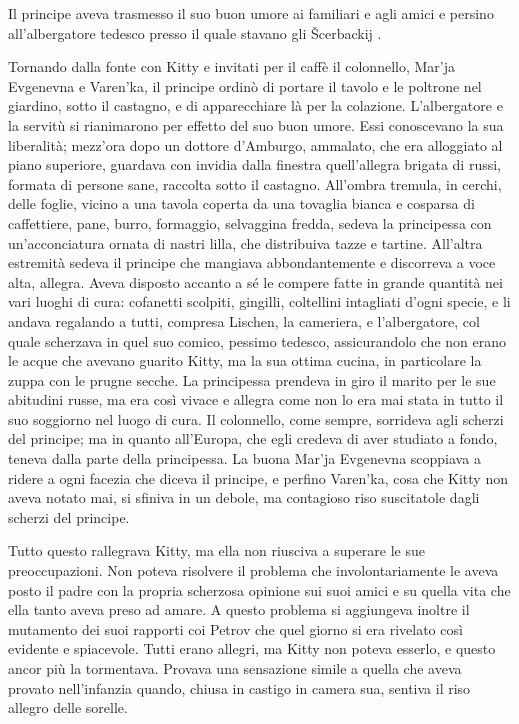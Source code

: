 Il principe aveva trasmesso il suo buon umore ai familiari e agli amici e persino all'albergatore tedesco presso il quale stavano gli Šcerbackij . 

Tornando dalla fonte con Kitty e invitati per il caffè il colonnello, Mar'ja Evgenevna e Varen'ka, il principe ordinò di portare il tavolo e le poltrone nel giardino, sotto il castagno, e di apparecchiare là per la colazione. L'albergatore e la servitù si rianimarono per effetto del suo buon umore. Essi conoscevano la sua liberalità; mezz'ora dopo un dottore d'Amburgo, ammalato, che era alloggiato al piano superiore, guardava con invidia dalla finestra quell'allegra brigata di russi, formata di persone sane, raccolta sotto il castagno. All'ombra tremula, in cerchi, delle foglie, vicino a una tavola coperta da una tovaglia bianca e cosparsa di caffettiere, pane, burro, formaggio, selvaggina fredda, sedeva la principessa con un'acconciatura ornata di nastri lilla, che distribuiva tazze e tartine. All'altra estremità sedeva il principe che mangiava abbondantemente e discorreva a voce alta, allegra. Aveva disposto accanto a sé le compere fatte in grande quantità nei vari luoghi di cura: cofanetti scolpiti, gingilli, coltellini intagliati d'ogni specie, e li andava regalando a tutti, compresa Lischen, la cameriera, e l'albergatore, col quale scherzava in quel suo comico, pessimo tedesco, assicurandolo che non erano le acque che avevano guarito Kitty, ma la sua ottima cucina, in particolare la zuppa con le prugne secche. La principessa prendeva in giro il marito per le sue abitudini russe, ma era così vivace e allegra come non lo era mai stata in tutto il suo soggiorno nel luogo di cura. Il colonnello, come sempre, sorrideva agli scherzi del principe; ma in quanto all'Europa, che egli credeva di aver studiato a fondo, teneva dalla parte della principessa. La buona Mar'ja Evgenevna scoppiava a ridere a ogni facezia che diceva il principe, e perfino Varen'ka, cosa che Kitty non aveva notato mai, si sfiniva in un debole, ma contagioso riso suscitatole dagli scherzi del principe. 

Tutto questo rallegrava Kitty, ma ella non riusciva a superare le sue preoccupazioni. Non poteva risolvere il problema che involontariamente le aveva posto il padre con la propria scherzosa opinione sui suoi amici e su quella vita che ella tanto aveva preso ad amare. A questo problema si aggiungeva inoltre il mutamento dei suoi rapporti coi Petrov che quel giorno si era rivelato così evidente e spiacevole. Tutti erano allegri, ma Kitty non poteva esserlo, e questo ancor più la tormentava. Provava una sensazione simile a quella che aveva provato nell'infanzia quando, chiusa in castigo in camera sua, sentiva il riso allegro delle sorelle. 

